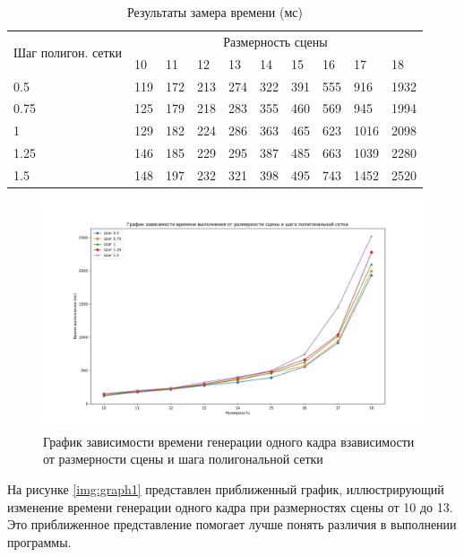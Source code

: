 \begin{table}[!ht]
    \centering
    \caption{\label{tb:tbl}Результаты замера времени (мс)}
    \begin{tabular}{|l|l|l|l|l|l|l|l|l|l|}
        \hline
        \multirow{2}{*}{Шаг полигон. сетки} & \multicolumn{9}{|c|}{Размерность сцены} \\ \cline{2-10}
         & 10 & 11 & 12 & 13 & 14 & 15 & 16 & 17 & 18 \\ \hline
        0.5 & 119 & 172 & 213 & 274 & 322 & 391 & 555 & 916 & 1932 \\ \hline
        0.75 & 125 & 179 & 218 & 283 & 355 & 460 & 569 & 945 & 1994 \\ \hline
        1 & 129 & 182 & 224 & 286 & 363 & 465 & 623 & 1016 & 2098 \\ \hline
        1.25 & 146 & 185 & 229 & 295 & 387 & 485 & 663 & 1039 & 2280 \\ \hline
        1.5 & 148 & 197 & 232 & 321 & 398 & 495 & 743 & 1452 & 2520 \\ \hline
    \end{tabular}
\end{table}

\begin{figure}[h]
    \centering
    \includegraphics[width=1\linewidth]{img/graph2.png}
    \caption{График зависимости времени генерации одного кадра взависимости от размерности сцены и шага полигональной сетки}
    \label{img:graph2}
\end{figure}
\noindent

\clearpage
На рисунке \ref{img:graph1} представлен приближенный график, иллюстрирующий изменение времени генерации одного кадра 
при размерностях сцены от 10 до 13. Это приближенное представление помогает лучше понять различия в выполнении программы.

